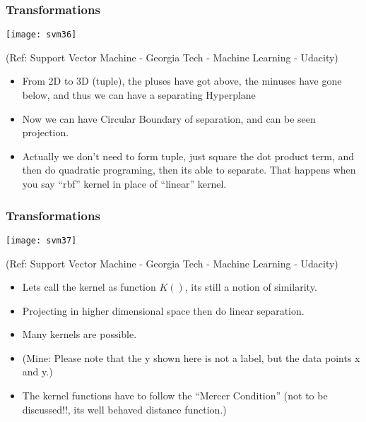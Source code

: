 \begin{frame}[fragile] \frametitle{Transformations}
\begin{center}
\texttt{[image: svm36]}

\tiny{(Ref: Support Vector Machine - Georgia Tech - Machine Learning - Udacity)}
\end{center}

\begin{itemize}
\item From 2D to 3D (tuple), the pluses have got above, the minuses have gone below, and thus we can have a separating Hyperplane
\item Now we can have Circular Boundary of separation, and can be seen projection.
\item Actually we don't need to form tuple, just square the dot product term, and then do quadratic programing, then its able to separate. That happens when you say ``rbf'' kernel in place of ``linear'' kernel.
\end{itemize}
\end{frame}

\begin{frame}[fragile] \frametitle{Transformations}
\begin{center}
\texttt{[image: svm37]}

\tiny{(Ref: Support Vector Machine - Georgia Tech - Machine Learning - Udacity)}
\end{center}

\begin{itemize}
\item Lets call the kernel as function $K()$, its still a notion of similarity.
\item Projecting in higher dimensional space then do linear separation.
\item Many kernels are possible.
\item (Mine: Please note that the y shown here is not a label, but the data points x and y.)
\item The kernel functions have to follow the ``Mercer Condition'' (not to be discussed!!, its well behaved distance function.)
\end{itemize}
\end{frame}




